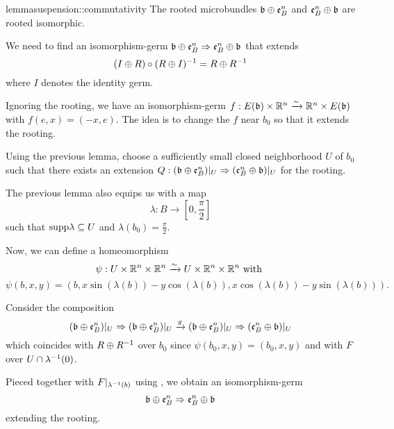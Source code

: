 \begin{mystatement}{lemma}{suspension::commutativity}
    The rooted microbundles $\whitney{\bb}{\be{B}}$ and $\whitney{\be{B}}{\bb}$ are rooted isomorphic. 
\end{mystatement}

\begin{myproof}
    We need to find an isomorphism-germ
    $\germ{\whitney{\bb}{\be{B}}}{\whitney{\be{B}}{\bb}}$ that extends
    \[ (I \oplus{} R) \circ (R \oplus{} I)^{-1} = R \oplus{} R^{-1} \]
    where $I$ denotes the identity germ.

    Ignoring the rooting, we have an
    isomorphism-germ $f: E(\bb) \cross \R^n \isomto \R^n \cross E(\bb)$ with $f(e, x) = (-x, e)$.
    The idea is to change the $f$ near $b_0$ so that it extends the rooting.

    Using the previous lemma, choose a sufficiently small closed neighborhood $U$ of $b_0$
    such that there exists an extension
    $\germdef{Q}{(\whitney{\bb}{\be{B}})\restr{U}}{(\whitney{\be{B}}{\bb})\restr{U}}$ for the rooting.

    The previous lemma also equips us with a map
    \[ \lambda: B \to [0, \frac{\pi}{2}] \]
    such that $\text{supp} \lambda \subseteq{} U$ and $\lambda(b_0) = \frac{\pi}{2}$.
    
    Now, we can define a homeomorphism
    \[ \psi: U \times \mathbb{R}^n \times \mathbb{R}^n \xrightarrow{\sim} U \times \mathbb{R}^n \times \mathbb{R}^n \text{ with } \]
    \[ \psi(b, x, y) = (b, x \sin(\lambda(b)) - y \cos(\lambda(b)), x \cos(\lambda(b)) - y \sin(\lambda(b))). \]

    Consider the composition
    \[ \germ{(\whitney{\bb}{\be{B}})\restr{U}}{(\whitney{\bb}{\be{B}})\restr{U}} \xto{g} \germ{(\whitney{\bb}{\be{B}})\restr{U}}{(\whitney{\be{B}}{\bb})\restr{U}} \]
    which coincides with $R \oplus{} R^{-1}$ over $b_0$
    since $\psi(b_0, x, y) = (b_0, x, y)$ and with $F$ over $U \cap \lambda^{-1}(0)$.
    
    Pieced together with $F\vert_{\lambda^{-1}(b)}$ using ,
    we obtain an isomorphism-germ 
    \[ \germ{\whitney{\bb}{\be{B}}}{\whitney{\be{B}}{\bb}} \]
    extending the rooting.
\end{myproof}